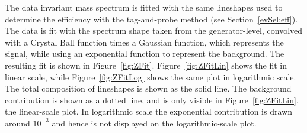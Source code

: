 
The data invariant mass spectrum is fitted with 
the same lineshapes used to determine the efficiency 
with the tag-and-probe method (see Section~\ref{evSel:eff}).  
The data is fit with the \Zee spectrum 
shape taken from the generator-level, 
convolved with a Crystal Ball function 
times a Gaussian function, 
which represents the signal, 
while using an exponential function to represent 
the background.
The resulting fit is shown in Figure~\ref{fig:ZFit}.  
Figure~\ref{fig:ZFitLin} shows the fit in linear
scale, while Figure~\ref{fig:ZFitLog} shows the
same plot in logarithmic scale.
The total composition of lineshapes is shown as the
solid line.
The background contribution is shown as a dotted line,
and is only visible in Figure~\ref{fig:ZFitLin}, the
linear-scale plot.
In logarithmic scale the exponential contribution is
drawn around $10^{-3}$ and hence is not displayed
on the logarithmic-scale plot.


